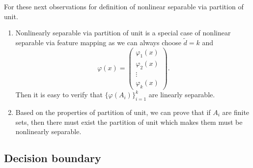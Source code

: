 \begin{remark}
	For these next observations for definition of nonlinear separable via partition of unit.
	\begin{enumerate}
		\item Nonlinearly separable via partition of unit is a special case of nonlinear separable via feature mapping as
		we can always choose $\tilde d = k$ and
		\begin{equation}\label{key}
		\varphi(x) = \begin{pmatrix}
		\varphi_1(x) \\
		\varphi_2(x) \\
		\vdots \\
		\varphi_k(x)
		\end{pmatrix}.
		\end{equation}
		Then it is easy to verify that $\{\varphi(A_i)\}_{i=1}^k$ are linearly separable.
		\item Based on the properties of partition of unit, we can prove that if $A_i$ are
		finite sets, then there must exist the partition of unit which makes them must be nonlinearly separable.
	\end{enumerate}
\end{remark}

\subsection{Decision boundary}